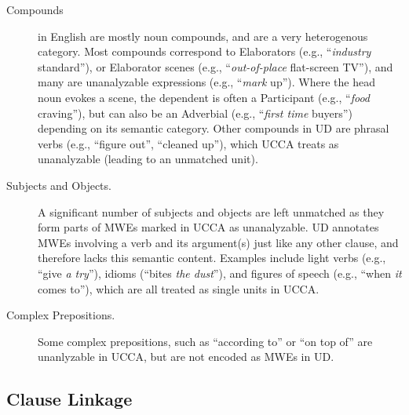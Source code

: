 \documentclass[11pt,a4paper]{article}
\newcommand{\oa}[1]{\footnote{\color{red}OA: #1}}
\begin{document}
\begin{description}
    \item[Compounds] in English are mostly noun compounds,
        and are a very heterogenous category.
        Most compounds correspond to Elaborators (e.g., ``\textit{industry} standard''),
        or Elaborator scenes (e.g., ``\textit{out-of-place} flat-screen TV''),
        and many are unanalyzable expressions (e.g., ``\textit{mark} up'').
        Where the head noun evokes a scene, the dependent is often a Participant
        (e.g., ``\textit{food} craving''), but can also be an Adverbial 
        (e.g., ``\textit{first time} buyers'') depending on its semantic category.
        Other compounds in UD are phrasal verbs (e.g., ``figure out'', ``cleaned up''), which UCCA treats as unanalyzable (leading to an unmatched 
        unit). 
            
    \item[Subjects and Objects.]
      A significant number of subjects and objects are left unmatched as they
      form parts of MWEs marked in UCCA as unanalyzable. UD annotates
      MWEs involving a verb and its argument(s) just like any other clause, and therefore
      lacks this semantic content. Examples include light verbs (e.g., ``give {\it a try}''),
      idioms (``bites {\it the dust}''), and figures of speech (e.g., ``when \textit{it} comes to''),
      which are all treated as single units in UCCA.
      
    \item[Complex Prepositions.] Some complex prepositions, such as ``according to'' or ``on top of''
      are unanlyzable in UCCA, but are not encoded as MWEs in UD.

%     
\end{description}


\subsection{Clause Linkage}\label{sec:linkage}
\end{document}
